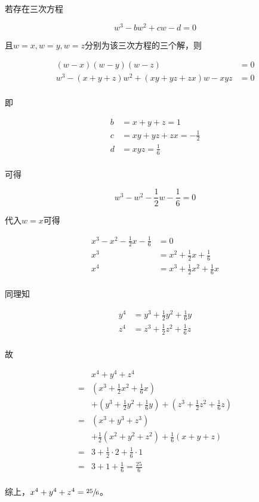 若存在三次方程

\[ w^3 - bw^2 + cw - d = 0 \]

且$w = x, w = y, w = z$分别为该三次方程的三个解，则

\begin{align*}
  (w - x)(w - y)(w - z) &= 0 \\
  w^3 - (x + y + z)w^2 + (xy + yz + zx)w - xyz &= 0 \\
\end{align*}

即

\begin{align*}
  b &= x + y + z = 1 \\
  c &= xy + yz + zx = -\frac12 \\
  d &= xyz = \frac16 \\
\end{align*}

可得

\[ w^3 - w^2 - \frac12w - \frac16 = 0 \]

代入$w = x$可得

\begin{align*}
  x^3 - x^2 - \frac12x - \frac16 &= 0 \\
  x^3 &= x^2 + \frac12x + \frac16 \\
  x^4 &= x^3 + \frac12x^2 + \frac16x \\
\end{align*}

同理知

\begin{align*}
  y^4 &= y^3 + \frac12y^2 + \frac16y \\
  z^4 &= z^3 + \frac12z^2 + \frac16z \\
\end{align*}

故

\begin{align*}
  & x^4 + y^4 + z^4 \\
  ={}& \left(x^3 + \frac12x^2 + \frac16x\right) \\
  &+ \left(y^3 + \frac12y^2 + \frac16y\right) + \left(z^3 + \frac12z^2 + \frac16z\right) \\
  ={}& (x^3 + y^3 + z^3) \\
  &+ \frac12(x^2 + y^2 + z^2) + \frac16(x + y + z) \\
  ={}& 3 + \frac12\cdot2 + \frac16\cdot1 \\
  ={}& 3 + 1 + \frac16 = \frac{25}6 \\
\end{align*}

综上，$x^4 + y^4 + z^4 = \sfrac{25}6$。

